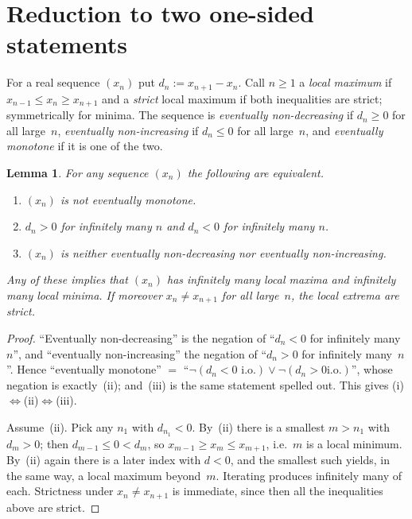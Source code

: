 \documentclass[11pt]{article}
\newtheorem{lemma}[theorem]{Lemma}
\theoremstyle{definition}
\begin{document}
\section{Reduction to two one-sided statements}\label{sec:reduction}

For a real sequence $(x_n)$ put $d_n:=x_{n+1}-x_n$. Call $n\ge 1$ a
\emph{local maximum} if $x_{n-1}\le x_n\ge x_{n+1}$ and a \emph{strict}
local maximum if both inequalities are strict; symmetrically for
minima. The sequence is \emph{eventually non-decreasing} if $d_n\ge 0$
for all large~$n$, \emph{eventually non-increasing} if $d_n\le 0$ for
all large~$n$, and \emph{eventually monotone} if it is one of the two.

\begin{lemma}\label{lem:reduction}
  For any sequence $(x_n)$ the following are equivalent.
  \begin{enumerate}[label=\rm(\roman*),leftmargin=2.4em]
  \item $(x_n)$ is not eventually monotone.
  \item $d_n>0$ for infinitely many $n$ \emph{and} $d_n<0$ for
    infinitely many $n$.
  \item $(x_n)$ is neither eventually non-decreasing nor eventually
    non-increasing.
  \end{enumerate}
  Any of these implies that $(x_n)$ has infinitely many local maxima
  and infinitely many local minima. If moreover $x_n\ne x_{n+1}$ for
  all large~$n$, the local extrema are strict.
\end{lemma}

\begin{proof}
  ``Eventually non-decreasing'' is the negation of ``$d_n<0$ for
  infinitely many~$n$'', and ``eventually non-increasing'' the
  negation of ``$d_n>0$ for infinitely many~$n$''. Hence ``eventually
  monotone'' $=$ ``$\neg(d_n<0\text{ i.o.})\vee\neg(d_n>0\text{
  i.o.})$'', whose negation is exactly~(ii); and~(iii) is the same
  statement spelled out. This gives (i)$\iff$(ii)$\iff$(iii).

  Assume~(ii). Pick any $n_1$ with $d_{n_1}<0$. By~(ii) there is a
  smallest $m>n_1$ with $d_m>0$; then $d_{m-1}\le 0<d_m$, so
  $x_{m-1}\ge x_m\le x_{m+1}$, i.e.\ $m$ is a local minimum.
  By~(ii) again there is a later index with $d<0$, and the smallest
  such yields, in the same way, a local maximum beyond~$m$. Iterating
  produces infinitely many of each. Strictness under $x_n\ne x_{n+1}$
  is immediate, since then all the inequalities above are strict.
\end{proof}
\end{document}
